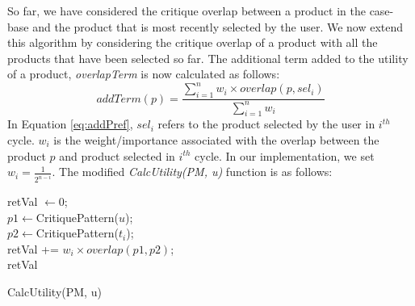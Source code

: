 So far, we have considered the critique overlap between a product in the case-base and the product that is most recently selected by the user.
We now extend this algorithm by considering the critique overlap of a product with all the products that have been selected so far.
The additional term added to the utility of a product, \textit{overlapTerm} is now calculated as follows:
\begin{equation}
\label{eq:addPref}
addTerm(p) = \frac{\sum_{i=1}^{n} {w_i \times overlap(p,sel_i)}} {\sum_{i=1}^{n}w_i}
\end{equation}
In Equation \ref{eq:addPref}, $sel_i$ refers to the product selected by the user in $i^{th}$ cycle.
$w_i$ is the weight/importance associated with the overlap between the product $p$ and product selected in $i^{th}$ cycle.
In our implementation, we set $w_i = \frac{1}{2^{n-i}}$.
The modified \textit{CalcUtility(PM, u)} function is as follows:

\begin{algorithm}[ht]
  \DontPrintSemicolon

  retVal $\gets 0$;\\
   {
      $p1 \gets $CritiquePattern($u$);\\
      $p2 \gets $CritiquePattern($t_i$);\\
      retVal += $w_i \times overlap(p1, p2)$;\\
  }
  \Return retVal
  \caption{CalcUtility(PM, u)}
  \label{algo:addPref2}
\end{algorithm}
